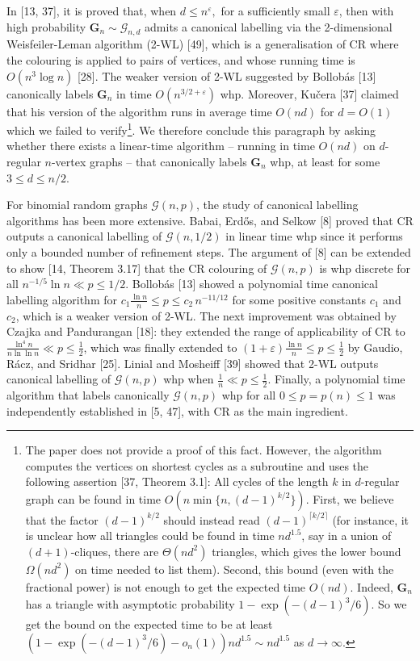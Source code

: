 \documentclass[10pt,a4paper]{article}
\begin{document}
In [13, 37], it is proved that, when $d\leq n^{\varepsilon},$ for a sufficiently small $\varepsilon$, then with high probability $\mathbf{G}_{n}\sim\mathcal{G}_{n,d}$ admits a canonical labelling via the 2-dimensional Weisfeiler-Leman algorithm (2-WL) [49], which is a generalisation of CR where the colouring is applied to pairs of vertices, and whose running time is $O(n^{3}\log n)$ [28]. The weaker version of 2-WL suggested by Bollobás [13]
canonically labels $\mathbf{G}_{n}$ in time $O(n^{3/2+\varepsilon})$ whp. Moreover, Kučera [37] claimed that his version of the algorithm runs in average time $O(nd)$ for $d=O(1)$ which we failed to verify\footnote{The paper does not provide a proof of this fact. However, the algorithm computes the vertices on shortest cycles as a subroutine and uses the following assertion [37, Theorem 3.1]: All cycles of the length $k$ in $d$-regular graph can be found in time $O(n\min\{n,(d-1)^{k/2}\})$. First, we believe that the factor $(d-1)^{k/2}$ should instead read $(d-1)^{\lceil k/2\rceil}$ (for instance, it is unclear how all triangles could be found in time $nd^{1.5}$, say in a union of $(d+1)$-cliques, there are $\Theta(nd^{2})$ triangles, which gives the lower bound $\Omega(nd^{2})$ on time needed to list them). Second, this bound (even with the fractional power) is not enough to get the expected time $O(nd)$. Indeed, $\mathbf{G}_{n}$ has a triangle with asymptotic probability $1-\exp(-(d-1)^{3}/6)$. So we get the bound on the expected time to be at least $(1-\exp(-(d-1)^{3}/6)-o_{n}(1))nd^{1.5}\sim nd^{1.5}$ as $d\to\infty$.}. We therefore conclude this paragraph by asking whether there exists a linear-time algorithm – running in time $O(nd)$ on $d$-regular $n$-vertex graphs – that canonically labels $\mathbf{G}_{n}$ whp, at least for some $3\leq d\leq n/2$.\par




For binomial random graphs $\mathcal{G}(n,p)$, the study of canonical labelling algorithms has been more extensive. Babai, Erdős, and Selkow [8] proved that CR outputs a canonical labelling of $\mathcal{G}(n,1/2)$ in linear time whp since it performs only a bounded number of refinement steps. The argument of [8] can be extended to show [14, Theorem 3.17] that the CR colouring of $\mathcal{G}(n,p)$ is whp discrete for all $n^{-1/5}\ln n\ll p\leq 1/2$. Bollobás [13] showed a polynomial time canonical labelling algorithm for $c_{1}\frac{\ln n}{n}\leq p\leq c_{2}\,n^{-11/12}$ for some positive constants $c_{1}$ and $c_{2}$, which is a weaker version of 2-WL. The next improvement was obtained by Czajka and Pandurangan [18]: they extended the range of applicability of CR to $\frac{\ln^{4}n}{n\ln\ln n}\ll p\leq\frac{1}{2}$, which was finally extended to $(1+\varepsilon)\frac{\ln n}{n}\leq p\leq\frac{1}{2}$ by Gaudio, Rácz, and Sridhar [25]. Linial and Mosheiff [39] showed that 2-WL outputs canonical labelling of $\mathcal{G}(n,p)$ whp when $\frac{1}{n}\ll p\leq\frac{1}{2}$. Finally, a polynomial time algorithm that labels canonically $\mathcal{G}(n,p)$ whp for all $0\leq p=p(n)\leq 1$ was independently established in [5, 47], with CR as the main ingredient.\par
\end{document}
